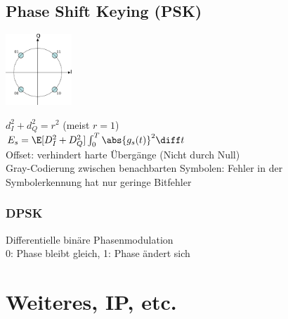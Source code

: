 \documentclass[fs, footer]{latex4ei}
\begin{document}
\begin{multicols*}{4}
{	\subsection{Phase Shift Keying (PSK)}
	\parbox{2.5cm}{
	\includegraphics[width = 2.5cm]{./img/QPSK.pdf}
	} \quad 
	\parbox{4cm}{ $d_I^2 + d_Q^2 = r^2$ \qquad (meist $r = 1$) \\ $E_s = \E[D_I^2 + D_Q^2] \int_0^T \abs{g_s(t)}^2 \diff t$ \\

	Offset: verhindert harte Übergänge (Nicht durch Null)\\
	Gray-Codierung zwischen benachbarten Symbolen: Fehler in der Symbolerkennung hat nur geringe Bitfehler\\	
	}
		\subsubsection{DPSK}
		Differentielle binäre Phasenmodulation\\
		0: Phase bleibt gleich, 1: Phase ändert sich\\


}







\section{Weiteres, IP, etc.}

\end{multicols*}
\end{document}
